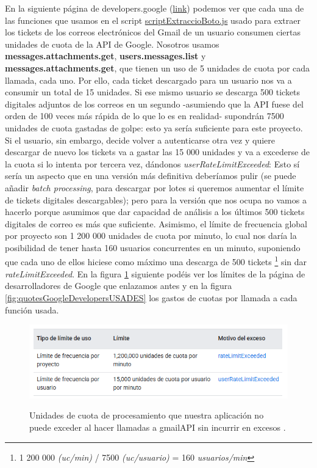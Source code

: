 \documentclass[a4paper,12pt]{report}
\begin{document}
	En la siguiente página de  developers.google \cite{gmail_api_quota} (\href{https://developers.google.com/workspace/gmail/api/reference/quota?hl=es-419}{link}) podemos ver que cada una de las funciones que usamos en el script \href{https://github.com/blackcub3s/mercAppAuxPas4/blob/main/js/scriptExtraccioBoto.js}{scriptExtraccioBoto.js} usado para extraer los tickets de los correos electrónicos del Gmail de un usuario consumen ciertas unidades de cuota de la API de Google. Nosotros usamos \textbf{messages.attachments.get}, \textbf{users.messages.list} y \textbf{messages.attachments.get}, que tienen un uso de 5 unidades de cuota por cada llamada, cada uno. Por ello, cada ticket descargado para un usuario nos va a consumir un total de 15 unidades. Si ese mismo usuario se descarga 500 tickets digitales adjuntos de los correos en un segundo -asumiendo que la API fuese del orden de 100 veces más rápida de lo que lo es en realidad- supondrán 7500 unidades de cuota gastadas de golpe: esto ya sería suficiente para este proyecto. Si el usuario, sin embargo, decide volver a autenticarse  otra vez y quiere descargar de nuevo los tickets va a gastar las 15 000 unidades y va a excederse de la cuota si lo intenta por tercera vez, dándonos \textit{userRateLimitExceeded}: Esto sí sería un aspecto que en una versión más definitiva deberíamos pulir (se puede añadir \textit{batch processing}, para descargar por lotes si queremos aumentar el límite de tickets digitales descargables); pero para la versión que nos ocupa no vamos a hacerlo porque asumimos que dar capacidad de análisis a los últimos 500  tickets digitales de correo es más que suficiente. Asimismo, el límite de frecuencia global por proyecto son 1 200 000 unidades de cuota por minuto, lo cual nos daría la posibilidad de tener hasta 160 usuarios concurrentes en un minuto, suponiendo que cada uno de ellos hiciese como máximo una descarga de 500  tickets \footnote{1 200 000 \textit{(uc/min)} / 7500 \textit{(uc/usuario)} = 160 \textit{\textit{usuarios/min}}} sin dar \textit{rateLimitExceeded}. En la figura \ref{fig:quotesGoogleDevelopers} siguiente podéis ver los límites de la página de desarrolladores de Google que enlazamos antes y en la figura \ref{fig:quotesGoogleDevelopersUSADES} los gastos de cuotas por llamada a cada función usada.
	
	
	\FloatBarrier
	\setlength{\belowcaptionskip}{3pt}
	\begin{figure}[H]
		\centering
		\caption{Unidades de cuota de procesamiento que nuestra aplicación no puede exceder al hacer llamadas a gmailAPI sin incurrir en excesos \cite{gmail_api_quota}.}
		\includegraphics[width=1\linewidth]{img/quotesGoogleDevelopers.png}
		\label{fig:quotesGoogleDevelopers}
	\end{figure}
	\FloatBarrier
	
\end{document}

